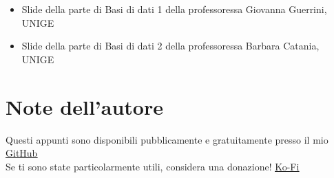 \begin{itemize}
    \item Slide della parte di Basi di dati 1 della professoressa Giovanna Guerrini, UNIGE
    \item Slide della parte di Basi di dati 2 della professoressa Barbara Catania, UNIGE
\end{itemize}

\section*{Note dell'autore}
Questi appunti sono disponibili pubblicamente e gratuitamente presso il mio \underline{\href{https://github.com/WolfenCLI/Database-class-notes}{GitHub}}\\
Se ti sono state particolarmente utili, considera una donazione! \underline{\href{https://ko-fi.com/wolfencli}{Ko-Fi}}